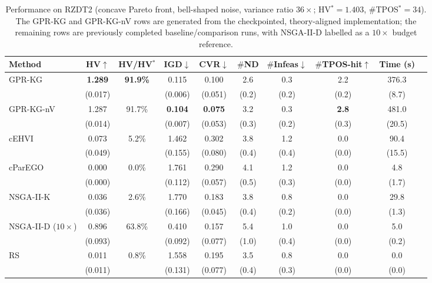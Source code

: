 \documentclass[12pt]{article}
\theoremstyle{plain}
\theoremstyle{definition}
\theoremstyle{remark}
\begin{document}
\begin{table}[t]
\centering
\caption{Performance on RZDT2 (concave Pareto front, bell-shaped
noise, variance ratio $36\times$; HV$^*=1.403$, $\#$TPOS$^*=34$).
The GPR-KG and GPR-KG-nV rows are generated from the checkpointed,
theory-aligned implementation; the remaining rows are previously
completed baseline/comparison runs, with NSGA-II-D labelled as a
$10\times$ budget reference.}
\label{tab:rzdt2}
\small
\setlength{\tabcolsep}{3.5pt}
\begin{tabular}{l cc ccc ccc c}
\toprule
Method & HV$\uparrow$ & HV/HV$^*$
       & IGD$\downarrow$ & CVR$\downarrow$
       & $\#$ND & $\#$Infeas$\downarrow$ & $\#$TPOS-hit$\uparrow$
       & Time (s) \\
\midrule
GPR-KG             & \textbf{1.289} & \textbf{91.9\%} & 0.115
                   & 0.100
                   & 2.6 & 0.3 & 2.2 & 376.3 \\
                   & (0.017) & & (0.006) & (0.051)
                   & (0.2) & (0.2) & (0.2) & (8.7) \\[2pt]
GPR-KG-nV          & 1.287 & 91.7\% & \textbf{0.104} & \textbf{0.075}
                   & 3.2 & 0.3 & \textbf{2.8} & 481.0 \\
                   & (0.014) & & (0.007) & (0.053)
                   & (0.3) & (0.2) & (0.3) & (20.5) \\[2pt]
cEHVI              & 0.073 & 5.2\% & 1.462 & 0.302
                   & 3.8 & 1.2 & 0.0 & 90.4 \\
                   & (0.049) & & (0.155) & (0.080)
                   & (0.4) & (0.4) & (0.0) & (15.5) \\[2pt]
cParEGO            & 0.000 & 0.0\% & 1.761 & 0.290
                   & 4.1 & 1.2 & 0.0 & 4.8 \\
                   & (0.000) & & (0.112) & (0.057)
                   & (0.5) & (0.3) & (0.0) & (1.7) \\[2pt]
NSGA-II-K          & 0.036 & 2.6\% & 1.770 & 0.183
                   & 3.8 & 0.8 & 0.0 & 29.8 \\
                   & (0.036) & & (0.166) & (0.045)
                   & (0.4) & (0.2) & (0.0) & (1.3) \\[2pt]
\midrule
NSGA-II-D ($10\times$)
                   & 0.896 & 63.8\% & 0.410 & 0.157
                   & 5.4 & 1.0 & 0.0 & 5.0 \\
                   & (0.093) & & (0.092) & (0.077)
                   & (1.0) & (0.4) & (0.0) & (0.2) \\[2pt]
\midrule
RS                 & 0.011 & 0.8\% & 1.558 & 0.195
                   & 3.5 & 0.8 & 0.0 & 0.0 \\
                   & (0.011) & & (0.131) & (0.077)
                   & (0.4) & (0.3) & (0.0) & (0.0) \\
\bottomrule
\end{tabular}
\end{table}
\end{document}

